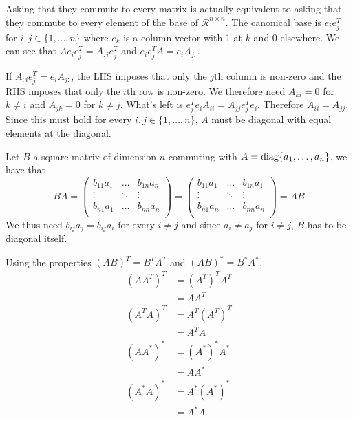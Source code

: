 \begin{solution}
  Asking that they commute to every matrix is actually equivalent to asking
  that they commute to every element of the base of $\mathcal{R}^{n \times n}$.
  The canonical base is $e_ie_j^T$ for $i,j \in \{1, \ldots, n\}$ where
  $e_k$ is a column vector with 1 at $k$ and 0 elsewhere.
  We can see that $Ae_ie_j^T = A_{:i}e_j^T$ and $e_ie_j^TA = e_iA_{j:}$.

  If $A_{:i}e_j^T = e_iA_{j:}$, the LHS imposes that only the $j$th column is non-zero
  and the RHS imposes that only the $i$th row is non-zero.
  We therefore need $A_{ki} = 0$ for $k \neq i$ and $A_{jk} = 0$ for $k \neq j$.
  What's left is $e_j^Te_iA_{ii} = A_{jj}e_j^Te_i$.
  Therefore $A_{ii} = A_{jj}$.
  Since this must hold for every $i,j \in \{1, \ldots, n\}$, $A$ must be diagonal
  with equal elements at the diagonal.
\end{solution}

\begin{solution}
  Let $B$ a square matrix of dimension $n$ commuting with $A = \operatorname{diag}\{a_1,\dots,a_n\}$,
  we have that
  \[
    B A =
    \begin{pmatrix}
      b_{11} a_1 & \dots & b_{1n} a_n \\
      \vdots & \ddots & \vdots \\
      b_{n1} a_1 & \dots & b_{nn} a_n \\
    \end{pmatrix}
    =
    \begin{pmatrix}
      b_{11} a_1 & \dots & b_{1n} a_1 \\
      \vdots & \ddots & \vdots \\
      b_{n1} a_n & \dots & b_{nn} a_n \\
    \end{pmatrix}
    = A B
  \]
  We thus need $b_{ij} a_j = b_{ij} a_i$ for every $i \neq j$
  and since $a_i \neq a_j$ for $i \neq j$, $B$ has to be diagonal itself.
\end{solution}

\begin{solution}
  Using the properties $(AB)^T = B^TA^T$ and $(AB)^* = B^*A^*$,
  \begin{align*}
    (AA^T)^T & = (A^T)^TA^T\\
             & = AA^T\\
    (A^TA)^T & = A^T(A^T)^T\\
             & = A^TA\\
    (AA^*)^* & = (A^*)^*A^*\\
             & = AA^*\\
    (A^*A)^* & = A^*(A^*)^*\\
             & = A^*A.
  \end{align*}
\end{solution}

